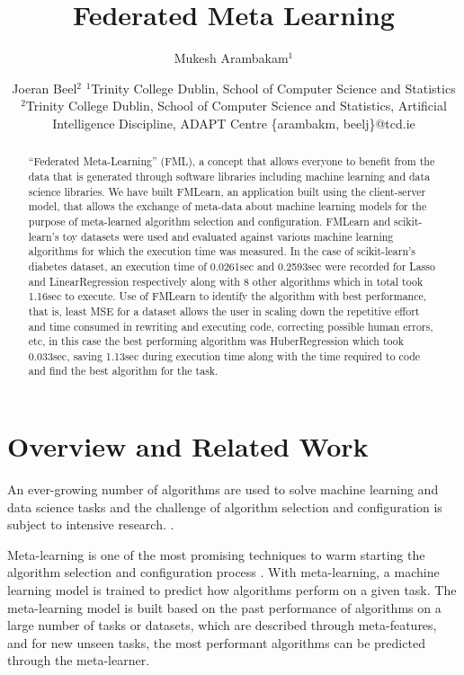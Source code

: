 \documentclass{article}
\title{Federated Meta Learning}
\author{
Mukesh Arambakam$^1$
\and
Joeran Beel$^2$
\affiliations
$^1$Trinity College Dublin,
School of Computer Science and Statistics\\
$^2$Trinity College Dublin,
School of Computer Science and Statistics,
Artificial Intelligence Discipline,
ADAPT Centre
\emails
\{arambakm, beelj\}@tcd.ie
}
\begin{document}
\maketitle

\begin{abstract}
“Federated Meta-Learning” (FML), a concept that allows everyone to benefit from the data that is generated through software libraries including machine learning and data science libraries. We have built FMLearn, an application built using the client-server model, that allows the exchange of meta-data about machine learning models for the purpose of meta-learned algorithm selection and configuration.
FMLearn and scikit-learn's toy datasets were used and evaluated against various machine learning algorithms for which the execution time was measured. In the case of scikit-learn’s diabetes dataset, an execution time of 0.0261sec and 0.2593sec were recorded for Lasso and LinearRegression respectively along with 8 other algorithms which in total took 1.16sec to execute. Use of FMLearn to identify the algorithm with best performance, that is, least MSE for a dataset allows the user in scaling down the repetitive effort and time consumed in rewriting and executing code, correcting possible human errors, etc, in this case the best performing algorithm was HuberRegression which took 0.033sec, saving 1.13sec during execution time along with the time required to code and find the best algorithm for the task.
\end{abstract}

\section{Overview and Related Work}
An ever-growing number of algorithms are used to solve machine learning and data science tasks and the challenge of algorithm selection and configuration is subject to intensive research. \cite{bischl-et-al,brazdil:p,calandra-et-al,collins-et-al2018,cunha-et-al2017,edenhofer-et-al,ferrari-et-al,hutter-et-al,kotthoff:l,lindauer-et-al,romero-et-al,tu:w,vartak-et-al}.

Meta-learning is one of the most promising techniques to warm starting the algorithm selection and configuration process \cite{hutter-et-al}. With meta-learning, a machine learning model is trained to predict how algorithms perform on a given task. The meta-learning model is built based on the past performance of algorithms on a large number of tasks or datasets, which are described through meta-features, and for new unseen tasks, the most performant algorithms can be predicted through the meta-learner.
\end{document}
